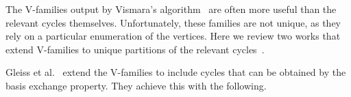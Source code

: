 \documentclass[fleqn,11pt]{article}
\begin{document}



The V-families output by Vismara's algorithm~\cite{vismaraUnion1997} are often more useful than the relevant cycles themselves. %
Unfortunately, these families are not unique, as they rely on a particular enumeration of the vertices. 
Here we review two works that extend V-families to unique partitions of the relevant cycles~\cite{gleissInterchangeability2000,kolodzikUnique2012}.


Gleiss {et al.}~\cite{gleissInterchangeability2000} extend the V-families to include cycles that can be obtained by the basis exchange property. They achieve this with the following.
\end{document}
